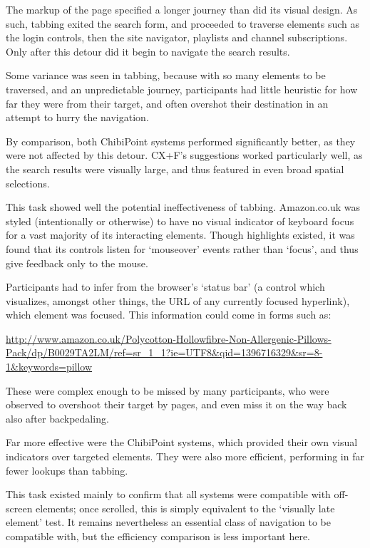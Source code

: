 \documentclass[11pt,openright,a4paper]{report}
\begin{document}
The markup of the page specified a longer journey than did its visual design. As such, tabbing exited the search form, and proceeded to traverse elements such as the login controls, then the site navigator, playlists and channel subscriptions. Only after this detour did it begin to navigate the search results.

Some variance was seen in tabbing, because with so many elements to be traversed, and an unpredictable journey, participants had little heuristic for how far they were from their target, and often overshot their destination in an attempt to hurry the navigation.

By comparison, both ChibiPoint systems performed significantly better, as they were not affected by this detour. CX+F's suggestions worked particularly well, as the search results were visually large, and thus featured in even broad spatial selections.

This task showed well the potential ineffectiveness of tabbing. Amazon.co.uk was styled (intentionally or otherwise) to have no visual indicator of keyboard focus for a vast majority of its interacting elements. Though highlights existed, it was found that its controls listen for `mouseover' events rather than `focus', and thus give feedback only to the mouse.

Participants had to infer from the browser's `status bar' (a control which visualizes, amongst other things, the URL of any currently focused hyperlink), which element was focused. This information could come in forms such as:

\raggedright\url{http://www.amazon.co.uk/Polycotton-Hollowfibre-Non-Allergenic-Pillows-Pack/dp/B0029TA2LM/ref=sr_1_1?ie=UTF8&qid=1396716329&sr=8-1&keywords=pillow}

These were complex enough to be missed by many participants, who were observed to overshoot their target by pages, and even miss it on the way back also after backpedaling.

Far more effective were the ChibiPoint systems, which provided their own visual indicators over targeted elements. They were also more efficient, performing in far fewer lookups than tabbing.

This task existed mainly to confirm that all systems were compatible with off-screen elements; once scrolled, this is simply equivalent to the `visually late element' test. It remains nevertheless an essential class of navigation to be compatible with, but the efficiency comparison is less important here.
\end{document}
